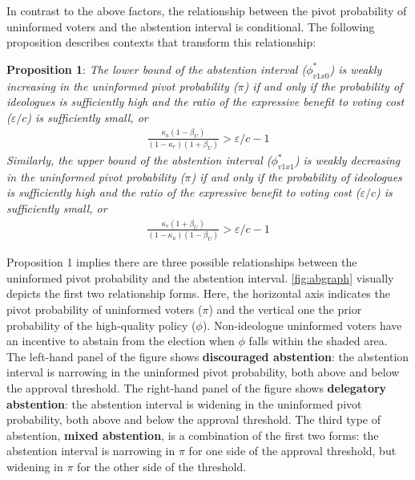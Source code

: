 \documentclass[doc,natbib,12pt]{apa6}
\begin{document}
	\par In contrast to the above factors, the relationship between the pivot probability of uninformed voters and the abstention interval is conditional. The following proposition describes contexts that transform this relationship:
	
	\noindent \textbf{Proposition 1}: \textit{The lower bound of the abstention interval ($\phi^*_{v1x0}$) is weakly increasing in the uninformed pivot probability ($\pi$) if and only if the probability of ideologues is sufficiently high and the ratio of the expressive benefit to voting cost ($\varepsilon/c$) is sufficiently small, or}
	\begin{align}
	\frac{\kappa_{a} (1 - \beta_U)}{(1-\kappa_{r})(1+\beta_U)} > \varepsilon/c - 1 \label{ecc1}
	\end{align}  
	\noindent \textit{Similarly, the upper bound of the abstention interval ($\phi^*_{v1x1}$) is weakly decreasing in the uninformed pivot probability ($\pi$) if and only if the probability of ideologues is sufficiently high and the ratio of the expressive benefit to voting cost ($\varepsilon/c$) is sufficiently small, or}
	\begin{align}
	\frac{\kappa_{r} (1 + \beta_U)}{(1-\kappa_{a})(1-\beta_U)} > \varepsilon/c - 1 \label{ecc2}
	\end{align}
	
	\noindent Proposition 1 implies there are three possible relationships between the uninformed pivot probability and the abstention interval. \autoref{fig:abgraph} visually depicts the first two relationship forms. Here, the horizontal axis indicates the pivot probability of uninformed voters ($\pi$) and the vertical one the prior probability of the high-quality policy ($\phi$). Non-ideologue uninformed voters have an incentive to abstain from the election when $\phi$ falls within the shaded area. The left-hand panel of the figure shows \textbf{discouraged abstention}: the abstention interval is narrowing in the uninformed pivot probability, both above and below the approval threshold. The right-hand panel of the figure shows \textbf{delegatory abstention}: the abstention interval is widening in the uninformed pivot probability, both above and below the approval threshold. The third type of abstention, \textbf{mixed abstention}, is a combination of the first two forms: the abstention interval is narrowing in $\pi$ for one side of the approval threshold, but widening in $\pi$ for the other side of the threshold.
	
\end{document}

